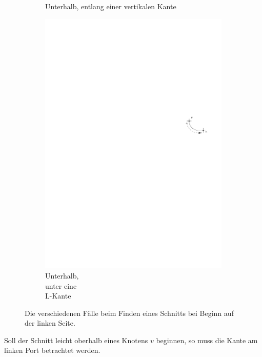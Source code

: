 \documentclass[a4paper]{scrreprt}
\theoremstyle{definition}
\begin{document}
\begin{figure}[h]
\begin{subfigure}[b]{0.2\textwidth}
                \caption{Unterhalb, entlang einer vertikalen Kante}
                \label{fig:cutfinding_bot_vertical}
        \end{subfigure}
        \quad
        \begin{subfigure}[b]{0.2\textwidth}
                \includegraphics[width=\textwidth]{schnitt_finden/bot_belowL}
                \caption{Unterhalb, \\ unter eine \\ L-Kante}
                \label{fig:cutfinding_bot_belowL}
        \end{subfigure}
        \caption{Die verschiedenen Fälle beim Finden eines Schnitts bei Beginn auf der linken Seite.}\label{fig:cutfinding}
\end{figure}


Soll der Schnitt leicht oberhalb eines Knotens $v$ beginnen, so muss die Kante am linken Port betrachtet werden.
\end{document}

